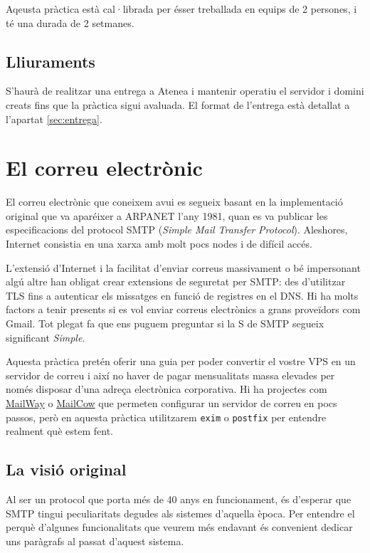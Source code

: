\documentclass{practicaitic}
\begin{document}
Aqeusta pràctica està cal·librada per ésser treballada en equips de 2 persones,
i té una durada de 2 setmanes.

\subsection{Lliuraments}

S'haurà de realitzar una entrega a Atenea i mantenir operatiu el servidor 
i domini creats fins que la pràctica sigui avaluada. El format de l'entrega
està detallat a l'apartat \ref{sec:entrega}.

\section{El correu electrònic}

El correu electrònic que coneixem avui es segueix basant en la
implementació original que va aparéixer a ARPANET l'any
1981, quan es va publicar les especificacions del protocol SMTP
(\textit{Simple Mail Transfer Protocol}). Aleshores, Internet consistia
en una xarxa amb molt pocs nodes i de difícil accés.

L'extensió d'Internet i la facilitat d'enviar correus massivament o bé
impersonant algú altre han obligat crear extensions de seguretat per
SMTP: des d'utilitzar TLS fins a autenticar els missatges en funció
de registres en el DNS. Hi ha molts factors a tenir presents si
es vol enviar correus electrònics a grans proveïdors com Gmail.
Tot plegat fa que ens puguem preguntar si la S de SMTP segueix
significant \textit{Simple}. %

Aquesta pràctica pretén oferir una guia per poder convertir el vostre
VPS en un servidor de correu i així no haver de pagar mensualitats 
massa elevades per només disposar d'una adreça electrònica corporativa.
Hi ha projectes com \href{https://docs.mailway.app/self-host/}{MailWay} o 
\href{https://docs.mailcow.email}{MailCow} que permeten configurar un
servidor de correu en pocs passos, però en aquesta pràctica utilitzarem
\texttt{exim} o \texttt{postfix} per entendre realment què estem fent.

\subsection{La visió original}

Al ser un protocol que porta més de 40 anys en funcionament, és d'esperar
que SMTP tingui peculiaritats degudes als sistemes d'aquella època. Per
entendre el perquè d'algunes funcionalitats que veurem més endavant és
convenient dedicar uns paràgrafs al passat d'aquest sistema.
\end{document}
